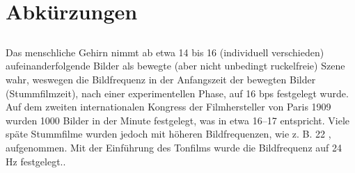 \section{Abkürzungen}
\label{sec:Abkürzungen}

\subsection{}

\gu Das menschliche Gehirn nimmt ab etwa 14 bis 16  (individuell verschieden) aufeinanderfolgende Bilder als bewegte (aber nicht unbedingt ruckelfreie) Szene wahr, weswegen die Bildfrequenz in der Anfangszeit der bewegten Bilder (Stummfilmzeit), nach einer experimentellen Phase, auf 16 \acrlong{bps} festgelegt wurde. Auf dem zweiten internationalen Kongress der Filmhersteller von Paris 1909 wurden 1000 Bilder in der Minute festgelegt, was in etwa 16–17  entspricht. Viele späte Stummfilme wurden jedoch mit höheren Bildfrequenzen, wie z. B. 22 , aufgenommen. Mit der Einführung des Tonfilms wurde die Bildfrequenz auf 24 Hz festgelegt.\go \citep{www:wikipedia:bildfrequenz.2017}.
